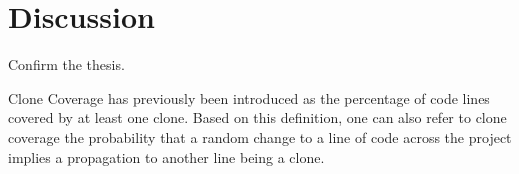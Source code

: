 
\section{Discussion}
\label{sec:discussion}

Confirm the thesis.

 Clone Coverage has previously been introduced as the percentage of code lines covered by at least one clone. Based on this definition, one can also refer to clone coverage the probability that a random change to a line of code across the project implies a propagation to another line being a clone.